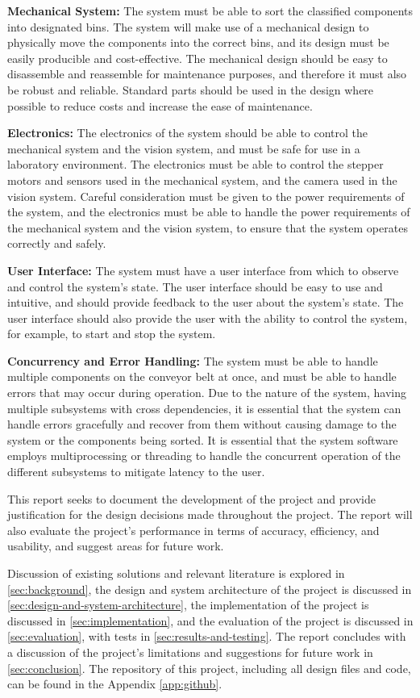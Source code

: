\textbf{Mechanical System:} The system must be able to sort the classified components into designated bins. The system will make use of a mechanical design to physically move the components into the correct bins, and its design must be easily producible and cost-effective. The mechanical design should be easy to disassemble and reassemble for maintenance purposes, and therefore it must also be robust and reliable. Standard parts should be used in the design where possible to reduce costs and increase the ease of maintenance.

\textbf{Electronics:} The electronics of the system should be able to control the mechanical system and the vision system, and must be safe for use in a laboratory environment. The electronics must be able to control the stepper motors and sensors used in the mechanical system, and the camera used in the vision system. Careful consideration must be given to the power requirements of the system, and the electronics must be able to handle the power requirements of the mechanical system and the vision system, to ensure that the system operates correctly and safely.

\textbf{User Interface:} The system must have a user interface from which to observe and control the system's state. The user interface should be easy to use and intuitive, and should provide feedback to the user about the system's state. The user interface should also provide the user with the ability to control the system, for example, to start and stop the system.

\textbf{Concurrency and Error Handling:} The system must be able to handle multiple components on the conveyor belt at once, and must be able to handle errors that may occur during operation. Due to the nature of the system, having multiple subsystems with cross dependencies, it is essential that the system can handle errors gracefully and recover from them without causing damage to the system or the components being sorted. It is essential that the system software employs multiprocessing or threading to handle the concurrent operation of the different subsystems to mitigate latency to the user.

This report seeks to document the development of the project and provide justification for the design decisions made throughout the project. The report will also evaluate the project's performance in terms of accuracy, efficiency, and usability, and suggest areas for future work.

Discussion of existing solutions and relevant literature is explored in \autoref{sec:background}, the design and system architecture of the project is discussed in \autoref{sec:design-and-system-architecture}, the implementation of the project is discussed in \autoref{sec:implementation}, and the evaluation of the project is discussed in \autoref{sec:evaluation}, with tests in \autoref{sec:results-and-testing}. The report concludes with a discussion of the project's limitations and suggestions for future work in \autoref{sec:conclusion}. The repository of this project, including all design files and code, can be found in the Appendix \ref{app:github}.
